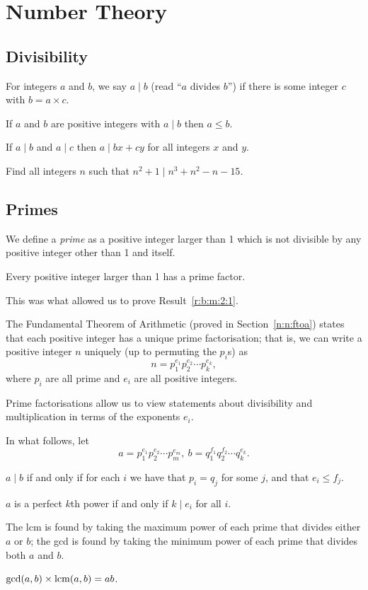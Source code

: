 \section{Number Theory}
\subsection{Divisibility}
  For integers $a$ and $b$, we say $a\mid b$ (read ``$a$ divides
  $b$'') if there is some integer $c$ with $b=a\times c$.
\begin{result}{\label{r:b:n:d:1}}
    If $a$ and $b$ are positive integers with $a\mid b$ then
      $a\le b$.
\end{result}
\begin{result}{\label{r:b:n:d:2}}
    If $a\mid b$ and $a\mid c$ then $a\mid bx+cy$ for all
      integers $x$ and $y$.
\end{result}
\begin{problem}{\label{p:b:n:d:1}}
    Find all integers $n$ such that $n^2+1\mid n^3+n^2-n-15$.
\end{problem}
\subsection{Primes}
  We define a \emph{prime} as a positive integer larger than 1 which is not
  divisible by any positive integer other than 1 and itself.
\begin{result}{\label{r:b:n:p:1}}
  Every positive integer larger than 1 has a prime factor.
\end{result}
This was what allowed us to prove Result~\ref{r:b:m:2:1}.

  The Fundamental Theorem of Arithmetic (proved in Section~\ref{n:n:ftoa})
  states that each positive integer has a unique prime factorisation; that is,
  we can write a positive integer $n$ uniquely (up to permuting the $p_i$s) as
  \[n=p_1^{e_1}p_2^{e_2}\cdots p_k^{e_k},\]
  where $p_i$ are all prime and $e_i$ are all positive integers.

  Prime factorisations allow us to view statements about divisibility and
  multiplication in terms of the exponents $e_i$.

  In what follows, let 
  \[a=p_1^{e_1}p_2^{e_2}\cdots p_m^{e_m},\
        b=q_1^{f_1}q_2^{f_2}\cdots q_k^{e_k}.\]
\begin{result}{\label{r:b:n:p:2}}
    $a\mid b$ if and only if for each $i$ we have that $p_i=q_j$
      for some $j$, and that $e_i\le f_j$.
\end{result}
\begin{result}{\label{r:b:n:p:3}}
    $a$ is a perfect $k$th power if and only if $k\mid e_i$ for all $i$.
\end{result}
\begin{result}{\label{r:b:n:p:4}}
    The lcm is found by taking the maximum power of each prime that
      divides either $a$ or $b$; the gcd is found by taking the minimum power of
      each prime that divides both $a$ and $b$.
\end{result}
\begin{result}{\label{r:b:n:p:5}}
    $\gcd(a,b)\times\mathrm{lcm}(a,b)=ab$.
\end{result}
